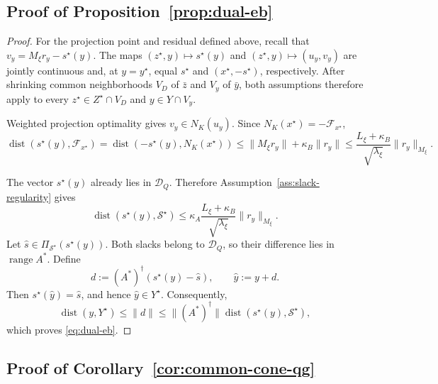 \documentclass[letterpaper]{article} %
\theoremstyle{definition}
\theoremstyle{remark}
\begin{document}
\subsection{Proof of Proposition~\ref{prop:dual-eb}}
\label{app:proof-dual-eb}

\begin{proof}
For the projection point and residual defined above, recall that
$v_y=M_\xi r_y-s^\star(y)$.  The maps
$(z^\star,y)\mapsto s^\star(y)$ and
$(z^\star,y)\mapsto(u_y,v_y)$ are jointly continuous and, at $y=y^\star$,
equal $s^\star$ and $(x^\star,-s^\star)$, respectively.  After shrinking
common neighborhoods $V_D$ of $\bar z$ and $V_y$ of $\bar y$, both
assumptions therefore apply to every
$z^\star\in Z^\star\cap V_D$ and $y\in Y\cap V_y$.

Weighted projection optimality gives
$v_y\in N_K(u_y)$.  Since
$N_K(x^\star)=-\mathcal F_{x^\star}$,
\[
    \operatorname{dist}(s^\star(y),\mathcal F_{x^\star}) = \operatorname{dist}(-s^\star(y),N_K(x^\star)) \le \|M_\xi r_y\|+\kappa_B\|r_y\| \le \frac{L_\xi+\kappa_B}{\sqrt{\lambda_\xi}} \|r_y\|_{M_\xi}.
\]

The vector $s^\star(y)$ already lies in $\mathcal D_Q$.  Therefore
Assumption~\ref{ass:slack-regularity} gives
\[
    \operatorname{dist}(s^\star(y),\mathcal S^\star)
    \le
    \kappa_A
    \frac{L_\xi+\kappa_B}{\sqrt{\lambda_\xi}}
    \|r_y\|_{M_\xi}.
\]
Let $\widehat s\in\Pi_{\mathcal S^\star}(s^\star(y))$.  Both slacks belong to
$\mathcal D_Q$, so their difference lies in $\operatorname{range}A^*$.
Define
\[
    d:=(A^*)^\dagger(s^\star(y)-\widehat s),
    \qquad
    \widehat y:=y+d.
\]
Then $s^\star(\widehat y)=\widehat s$, and hence
$\widehat y\in Y^\star$.  Consequently,
\[
    \operatorname{dist}(y,Y^\star)
    \le
    \|d\|
    \le
    \|(A^*)^\dagger\|
    \operatorname{dist}(s^\star(y),\mathcal S^\star),
\]
which proves \eqref{eq:dual-eb}.
\end{proof}

\subsection{Proof of Corollary~\ref{cor:common-cone-qg}}
\label{app:proof-common-cone-qg}
\end{document}
